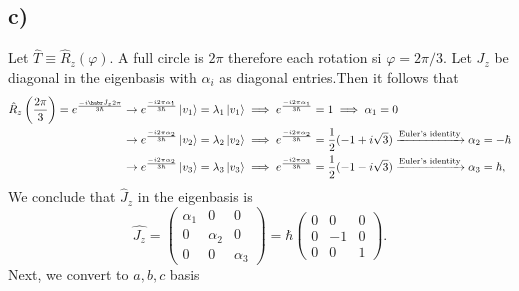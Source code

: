 \documentclass[
	12pt,
	]{article}
\theoremstyle{definition}
\theoremstyle{definition}
\theoremstyle{definition}
\theoremstyle{definition}
\theoremstyle{definition}
\theoremstyle{example}
\theoremstyle{note}
\theoremstyle{remark}
\theoremstyle{example}
\begin{document}
			\subsection*{c) }
				Let $\hat{T} \equiv \hat{R}_{z}(\varphi)$. A full circle is $2\pi$ therefore each rotation si $\varphi =2\pi /3$. Let $J_{z}$ be diagonal in the eigenbasis with $\alpha_{i}$ as diagonal entries.Then it follows that
				\begin{align*}
					\hat{R}_{z} \left(\frac{2\pi}{3}\right) = e^{\frac{-i \habr \hat{J}_{z} 2 \pi }{3 \hbar }} &\to e^{\frac{-i 2 \pi \alpha_{1}}{3\hbar }} \ket{v_{1}} = \lambda_{1} \ket{v_{1}} \implies  e^{\frac{-i 2 \pi \alpha_{1}}{3\hbar }} = 1 \implies \alpha_{1} = 0 \\
					&\to e^{\frac{-i 2 \pi \alpha_{2}}{3\hbar }} \ket{v_{2}} = \lambda_{2} \ket{v_{2}} \implies  e^{\frac{-i 2 \pi \alpha_{2}}{3\hbar }} = \frac12 (-1 + i \sqrt{3}) \xrightarrow{\text{Euler's identity}} \alpha_{2} = -\hbar \\
					&\to e^{\frac{-i 2 \pi \alpha_{2}}{3\hbar }} \ket{v_{3}} = \lambda_{3} \ket{v_{3}} \implies  e^{\frac{-i 2 \pi \alpha_{3}}{3\hbar }} = \frac12 (-1 - i \sqrt{3}) \xrightarrow{\text{Euler's identity}} \alpha_{3} = \hbar,
				\end{align*}
				We conclude that $\hat{J}_{z}$ in the eigenbasis is
				$$ \hat{J_{z}} = \begin{pmatrix}
					\alpha_{1} & 0 & 0 \\0 & \alpha_{2} & 0 \\
					0& 0& \alpha_{3}
				\end{pmatrix} = 
				\hbar\begin{pmatrix}
					0 & 0 & 0 \\ 0 & -1 & 0 \\ 0 & 0 & 1
				\end{pmatrix}.$$
				Next, we convert to $a,b,c$ basis
\end{document}
